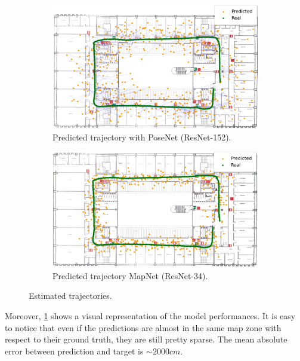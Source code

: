 \begin{figure}[htbp]
    \begin{subfigure}[b]{0.48\textwidth}
        \centering
        \includegraphics[width=1\textwidth]{./imgs/posenet_map.png}
        \caption{Predicted trajectory with PoseNet (ResNet-152).}
        \label{fig:trajectory-posenet}
    \end{subfigure}
    \hfill
    \begin{subfigure}[b]{0.48\textwidth}
        \includegraphics[width=1\textwidth]{./imgs/mapnet_map.png}
        \caption{Predicted trajectory MapNet (ResNet-34).}
        \label{fig:trajectory-mapnet}
    \end{subfigure}
    \caption{Estimated trajectories.}
\end{figure}
Moreover, \cref{fig:trajectory-posenet} shows a visual representation of the model performances. It is easy to notice that even if the predictions are almost in the same map zone with respect to their ground truth, they are still pretty sparse. The mean absolute error between prediction and target is $\sim 2000cm$.

